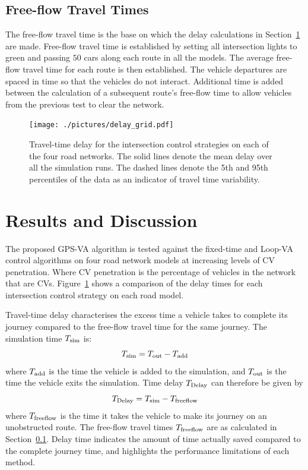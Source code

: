 \documentclass[numbered]{trbunofficial}
\begin{document}
\subsection{Free-flow Travel Times}\label{sec:freeflow}
The free-flow travel time is the base on which the delay calculations in Section~\ref{sec:discussion} are made. Free-flow travel time is established by setting all intersection lights to green and passing $50$ cars along each route in all the models. The average free-flow travel time for each route is then established. The vehicle departures are spaced in time so that the vehicles do not interact. Additional time is added between the calculation of a subsequent route's free-flow time to allow vehicles from the previous test to clear the network.

\begin{figure}[!tb]
	\begin{center} 
		\texttt{[image: ./pictures/delay\_grid.pdf]}
		\vspace{-15pt}
		\caption{Travel-time delay for the intersection control strategies on each of the four road networks. The solid lines denote the mean delay over all the simulation runs. The dashed lines denote the 5th and 95th percentiles of the data as an indicator of travel time variability.}
		\label{fig:results}
	\end{center}
	\vspace{-5pt}
\end{figure}

\section{Results and Discussion}\label{sec:discussion}
The proposed GPS-VA algorithm is tested against the fixed-time and Loop-VA control algorithms on four road network models at increasing levels of CV penetration. Where CV penetration is the percentage of vehicles in the network that are CVs. Figure~\ref{fig:results} shows a comparison of the delay times for each intersection control strategy on each road model. 

Travel-time delay characterises the excess time a vehicle takes to complete its journey compared to the free-flow travel time for the same journey. The simulation time $T_{\rm sim}$ is:
\begin{equation}
T_{\rm sim} = T_{\rm out} - T_{\rm add}
\end{equation}
where $T_{\rm add}$ is the time the vehicle is added to the simulation, and $T_{\rm out}$ is the time the vehicle exits the simulation. Time delay $T_{\rm Delay}$ can therefore be given by
\begin{equation}
T_{\rm Delay} = T_{\rm sim} - T_{\rm freeflow}
\end{equation}	
where $T_{\rm freeflow}$ is the time it takes the vehicle to make its journey on an unobstructed route. The free-flow travel times $T_{\rm freeflow}$ are as calculated in Section~\ref{sec:freeflow}. Delay time indicates the amount of time actually saved compared to the complete journey time, and highlights the performance limitations of each method.
\end{document}
